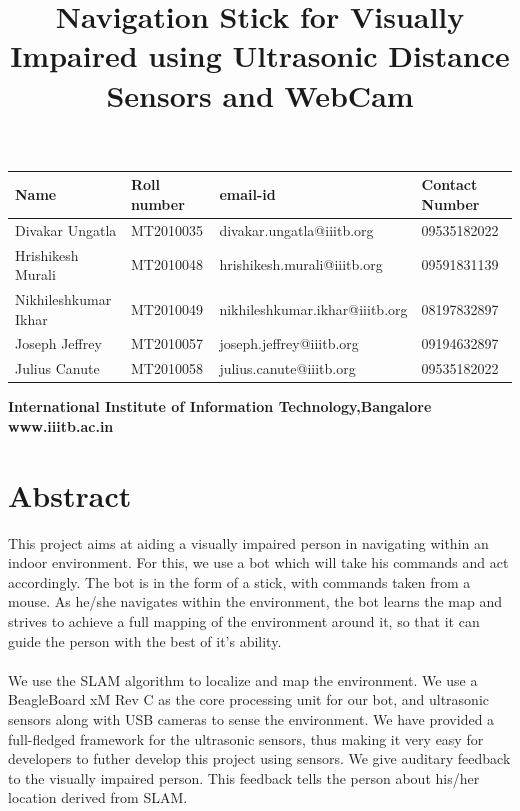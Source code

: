\documentclass[12pt]{article}
\begin{document}


\title{ \bf{Navigation Stick for Visually Impaired using Ultrasonic Distance Sensors and WebCam}}
\date{}
\maketitle
\thispagestyle{empty}
\begin{center}
\end{center}
\begin{center}
    \begin{tabular}[l]{ |l |l |l|l|}
    \rowcolor{gray!50} 
     \hline
    
    Name & Roll number & email-id & Contact Number\\ \hline \hline
    Divakar Ungatla & MT2010035 &divakar.ungatla@iiitb.org & 09535182022  \\ \hline 
    Hrishikesh Murali & MT2010048  &hrishikesh.murali@iiitb.org & 09591831139 \\ \hline 
    Nikhileshkumar Ikhar & MT2010049 & nikhileshkumar.ikhar@iiitb.org & 08197832897 \\ \hline 
    Joseph Jeffrey & MT2010057 & joseph.jeffrey@iiitb.org & 09194632897 \\ \hline 
    Julius Canute & MT2010058 & julius.canute@iiitb.org & 09535182022 \\ \hline


    \hline 
    \end{tabular}
\end{center}

\vfill
\begin{center}
\textbf{International Institute of Information Technology,Bangalore}
\textbf{www.iiitb.ac.in}
\end{center}

\newpage
\section*{Abstract}
This project aims at aiding a visually impaired person in navigating within an indoor environment. For this, we use a bot which will take his commands and act accordingly. The bot is in the form of a stick, with commands taken from a mouse. As he/she navigates within the environment, the bot learns the map and strives to achieve a full mapping of the environment around it, so that it can guide the person with the best of it's ability.\\\\
We use the SLAM algorithm to localize and map the environment. We use a BeagleBoard xM Rev C as the core processing unit for our bot, and ultrasonic sensors along with USB cameras to sense the environment. We have provided a full-fledged framework for the ultrasonic sensors, thus making it very easy for developers to futher develop this project using sensors. We give auditary feedback to the visually impaired person. This feedback tells the person about his/her location derived from SLAM.
\end{document}
